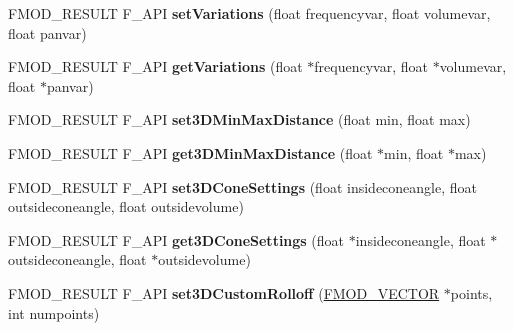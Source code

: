 \begin{DoxyCompactItemize}
\item 
F\+M\+O\+D\+\_\+\+R\+E\+S\+U\+LT F\+\_\+\+A\+PI {\bfseries set\+Variations} (float frequencyvar, float volumevar, float panvar)\hypertarget{class_f_m_o_d_1_1_sound_adc2709acd1734f56b55c12dee01cda7b}{}\label{class_f_m_o_d_1_1_sound_adc2709acd1734f56b55c12dee01cda7b}

\item 
F\+M\+O\+D\+\_\+\+R\+E\+S\+U\+LT F\+\_\+\+A\+PI {\bfseries get\+Variations} (float $\ast$frequencyvar, float $\ast$volumevar, float $\ast$panvar)\hypertarget{class_f_m_o_d_1_1_sound_a62af5aa6618aca4965b91dd01672b2b3}{}\label{class_f_m_o_d_1_1_sound_a62af5aa6618aca4965b91dd01672b2b3}

\item 
F\+M\+O\+D\+\_\+\+R\+E\+S\+U\+LT F\+\_\+\+A\+PI {\bfseries set3\+D\+Min\+Max\+Distance} (float min, float max)\hypertarget{class_f_m_o_d_1_1_sound_acc2bb0f37e41ccdacfc27ec28cd2cd26}{}\label{class_f_m_o_d_1_1_sound_acc2bb0f37e41ccdacfc27ec28cd2cd26}

\item 
F\+M\+O\+D\+\_\+\+R\+E\+S\+U\+LT F\+\_\+\+A\+PI {\bfseries get3\+D\+Min\+Max\+Distance} (float $\ast$min, float $\ast$max)\hypertarget{class_f_m_o_d_1_1_sound_aca77cc87d0375dcf9d26be19073dcc45}{}\label{class_f_m_o_d_1_1_sound_aca77cc87d0375dcf9d26be19073dcc45}

\item 
F\+M\+O\+D\+\_\+\+R\+E\+S\+U\+LT F\+\_\+\+A\+PI {\bfseries set3\+D\+Cone\+Settings} (float insideconeangle, float outsideconeangle, float outsidevolume)\hypertarget{class_f_m_o_d_1_1_sound_a9b239365e93cf9ec141b8239b2770e0a}{}\label{class_f_m_o_d_1_1_sound_a9b239365e93cf9ec141b8239b2770e0a}

\item 
F\+M\+O\+D\+\_\+\+R\+E\+S\+U\+LT F\+\_\+\+A\+PI {\bfseries get3\+D\+Cone\+Settings} (float $\ast$insideconeangle, float $\ast$outsideconeangle, float $\ast$outsidevolume)\hypertarget{class_f_m_o_d_1_1_sound_a9033acfd185c7e24c706e83effbdb516}{}\label{class_f_m_o_d_1_1_sound_a9033acfd185c7e24c706e83effbdb516}

\item 
F\+M\+O\+D\+\_\+\+R\+E\+S\+U\+LT F\+\_\+\+A\+PI {\bfseries set3\+D\+Custom\+Rolloff} (\hyperlink{struct_f_m_o_d___v_e_c_t_o_r}{F\+M\+O\+D\+\_\+\+V\+E\+C\+T\+OR} $\ast$points, int numpoints)\hypertarget{class_f_m_o_d_1_1_sound_a277c94985b2caf5aed6125604a6d6f74}{}\label{class_f_m_o_d_1_1_sound_a277c94985b2caf5aed6125604a6d6f74}


\end{DoxyCompactItemize}
